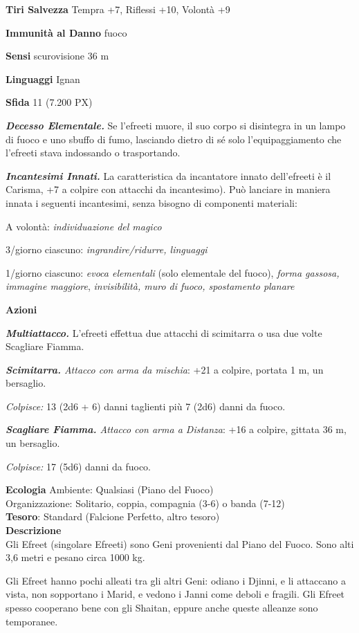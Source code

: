 \begin{multicols}{2}
\textbf{Tiri Salvezza} Tempra +7, Riflessi +10, Volontà +9

\textbf{Immunità al Danno} fuoco

\textbf{Sensi} scurovisione 36 m

\textbf{Linguaggi} Ignan

\textbf{Sfida} 11 (7.200 PX)

\textit{\textbf{Decesso Elementale.}} Se l'efreeti muore, il suo corpo si disintegra in un lampo di fuoco e uno sbuffo di fumo, lasciando dietro di sé solo l'equipaggiamento che l'efreeti stava indossando o trasportando.

\textit{\textbf{Incantesimi Innati.}} La caratteristica da incantatore innato dell'efreeti è il Carisma, +7 a colpire con attacchi da incantesimo). Può lanciare in maniera innata i seguenti incantesimi, senza bisogno di componenti materiali:

A volontà: \textit{individuazione del magico}

3/giorno ciascuno: \textit{ingrandire/ridurre, linguaggi}

1/giorno ciascuno: \textit{evoca elementali} (solo elementale del fuoco), \textit{forma gassosa, immagine maggiore}, \textit{invisibilità, muro di fuoco, spostamento planare}

\textbf{Azioni}

\textit{\textbf{Multiattacco.}} L'efreeti effettua due attacchi di scimitarra o usa due volte Scagliare Fiamma.

\textit{\textbf{Scimitarra.} Attacco con arma da mischia}: +21 a colpire, portata 1 m, un bersaglio.

\textit{Colpisce:} 13 (2d6 + 6) danni taglienti più 7 (2d6) danni da fuoco.

\textit{\textbf{Scagliare Fiamma.} Attacco con arma a Distanza}: +16 a colpire, gittata 36 m, un bersaglio.

\textit{Colpisce:} 17 (5d6) danni da fuoco.

\textbf{Ecologia}
Ambiente: Qualsiasi (Piano del Fuoco)\\
Organizzazione: Solitario, coppia, compagnia (3-6) o banda (7-12)\\
\textbf{Tesoro}: Standard (Falcione Perfetto, altro tesoro)\\
\textbf{Descrizione}\\
Gli Efreet (singolare Efreeti) sono Geni provenienti dal Piano del Fuoco. Sono alti 3,6 metri e pesano circa 1000 kg.

Gli Efreet hanno pochi alleati tra gli altri Geni: odiano i Djinni, e li attaccano a vista, non sopportano i Marid, e vedono i Janni come deboli e fragili. Gli Efreet spesso cooperano bene con gli Shaitan, eppure anche queste alleanze sono temporanee.



\end{multicols}
